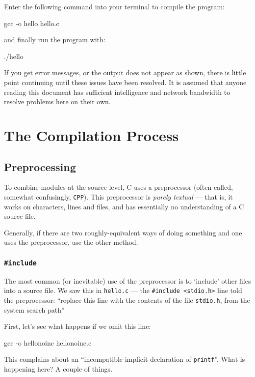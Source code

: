 \documentclass[a4paper,10pt]{article}
\newcommand{\drmcode}[3]{\begin{minipage}{\columnwidth}\end{minipage}}
\newcommand{\ccode}[2]{\drmcode{C}{#1}{#2.c}}
\newcommand{\kw}[1]{\texttt{#1}}
\newcommand{\cfile}[1]{\texttt{#1}}
\begin{document}
\noindent
Enter the following command into your terminal to compile
the program:

gcc -o hello hello.c
\END

\noindent
and finally run the program with:

./hello
\END

\noindent{}
If you get error messages, or the output does not appear as shown,
there is little point continuing until these issues have been
resolved. It is assumed that anyone reading this document has
sufficient intelligence and network bandwidth to resolve problems here
on their own.

\section{The Compilation Process}



\subsection{Preprocessing}

To combine modules at the source level, C uses a preprocessor (often
called, somewhat confusingly, \kw{CPP}). This preprocessor is
\emph{purely textual} --- that is, it works on characters, lines and
files, and has essentially no understanding of a C source file.



Generally, if there are two roughly-equivalent ways of doing something
and one uses the preprocessor, use the other method.

\subsubsection{\kw{#include}}

The most common (or inevitable) use of the preprocessor is to
`include' other files into a source file. We saw this in \cfile{hello.c}
--- the \verb!#include <stdio.h>! line told the preprocessor:
``replace this line with the contents of the file \cfile{stdio.h}, from
the system search path''

First, let's see what happens if we omit this line:

\ccode{\cfile{hellonoinc.c}}{hellonoinc}

gcc -o hellonoinc hellonoinc.c
\END

\noindent
This complains about an ``incompatible implicit declaration of
\kw{printf}''. What is happening here? A couple of things.
\end{document}
